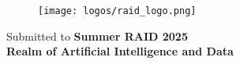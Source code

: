 \documentclass[11pt,a4paper]{article}
\begin{document}
\vfill

\begin{figure}[b]
    \centering
    \texttt{[image: logos/raid\_logo.png]}
\end{figure}


\begin{center}

Submitted to \textbf{Summer RAID 2025}\\
\textbf{Realm of Artificial Intelligence and Data}
\end{center}
\end{document}
